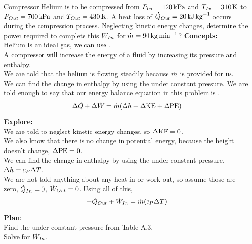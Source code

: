 \begin{example}{Compressor}
  Helium is to be compressed from $P_{In} = \SI{120}{\kilo\pascal}$ and $T_{In} = \SI{310}{\kelvin}$ to $P_{Out} = \SI{700}{\kilo\pascal}$ and $T_{Out} = \SI{430}{\kelvin}$.
  A heat loss of $\dot{Q}_{Out} = \SI{20}{\kilo\joule\per\kilo\gram}$ occurs during the compression process.
  Neglecting kinetic energy changes, determine the power required to complete this $\dot{W}_{In}$ for $\dot{m} = \SI{90}{\kilo\gram\per\minute}$?
  \tcblower{}
  \textbf{Concepts:} \\
  Helium is an ideal gas, we can use . \\
  A compressor will increase the energy of a fluid by increasing its pressure and enthalpy. \\
  We are told that the helium is flowing steadily because $\dot{m}$ is provided for us. \\
  We can find the change in enthalpy by using the  under constant pressure.
  We are told enough to say that our energy balance equation in this problem is .
  \begin{equation*}
    \Delta \dot{Q} + \Delta \dot{W} = \dot{m} (\Delta h + \Delta \mathrm{KE} + \Delta \mathrm{PE})
  \end{equation*}

  \textbf{Explore:} \\
  We are told to neglect kinetic energy changes, so $\Delta \mathrm{KE} = 0$. \\
  We also know that there is no change in potential energy, because the height doesn't change, $\Delta \mathrm{PE} = 0$. \\
  We can find the change in enthalpy by using the  under constant pressure, $\Delta h = c_{P} \Delta T$. \\
  We are not told anything about any heat in or work out, so assume those are zero, $\dot{Q}_{In} = 0$, $\dot{W}_{Out} = 0$.
  Using all of this,
  \begin{equation*}
    -\dot{Q}_{Out} + \dot{W}_{In} = \dot{m} (c_{P} \Delta T)
  \end{equation*}

  \textbf{Plan:} \\
  Find the  under constant pressure from Table A.3. \\
  Solve for $\dot{W}_{In}$.


\end{example}
